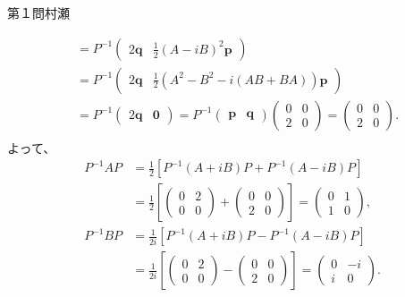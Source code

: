 \begin{answer}{第１問}{村瀬}
\begin{enumerate}
\begin{enumerate}
\begin{align*}
       &= P^{-1} \begin{pmatrix}2\bm{q} & \frac12 (A-iB)^2 \bm{p}\end{pmatrix}\\
       &= P^{-1} \begin{pmatrix}2\bm{q} & \frac12 (A^2-B^2-i(AB+BA)) \bm{p}\end{pmatrix}\\
       &= P^{-1} \begin{pmatrix}2\bm{q} & \bm{0}\end{pmatrix}
        = P^{-1} \begin{pmatrix}\bm p&\bm q\end{pmatrix} \begin{pmatrix}0& 0 \\ 2 & 0\end{pmatrix}
        = \begin{pmatrix}0& 0 \\ 2 & 0\end{pmatrix}.\\
    \end{align*}
    よって、
    \begin{align*}
      P^{-1} AP
       &= \frac12[P^{-1} (A+iB)P +P^{-1} (A-iB)P]\\
       &= \frac12\left[ \begin{pmatrix}0& 2 \\ 0 & 0\end{pmatrix} + \begin{pmatrix}0& 0 \\ 2 & 0\end{pmatrix} \right]
        = \begin{pmatrix}0& 1 \\ 1 & 0\end{pmatrix},\\
      P^{-1} BP
       &= \frac1{2i}[P^{-1} (A+iB)P - P^{-1} (A-iB)P]\\
       &= \frac1{2i}\left[ \begin{pmatrix}0& 2 \\ 0 & 0\end{pmatrix} - \begin{pmatrix}0& 0 \\ 2 & 0\end{pmatrix} \right]
        = \begin{pmatrix}0& -i \\ i & 0\end{pmatrix}.
    \end{align*}
  \end{enumerate}


\end{enumerate}
\end{answer}
